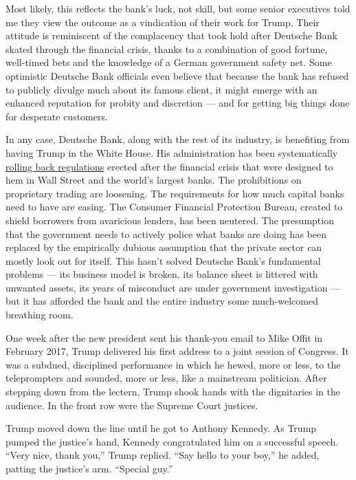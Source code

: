 Most likely, this reflects the bank's luck, not skill, but some senior
executives told me they view the outcome as a vindication of their work
for Trump. Their attitude is reminiscent of the complacency that took
hold after ­Deutsche Bank skated through the financial crisis, thanks to
a combination of good fortune, well-­timed bets and the knowledge of a
German government safety net. Some optimistic ­Deutsche Bank officials
even believe that because the bank has refused to publicly divulge much
about its famous client, it might emerge with an enhanced reputation for
probity and discretion --- and for getting big things done for desperate
customers.

In any case, ­Deutsche Bank, along with the rest of its industry, is
benefiting from having Trump in the White House. His administration has
been systematically
\href{https://www.nytimes3xbfgragh.onion/2019/10/10/business/economy/federal-reserve-bank-regulations.html}{rolling
back regulations} erected after the financial crisis that were designed
to hem in Wall Street and the world's largest banks. The prohibitions on
proprietary trading are loosening. The requirements for how much capital
banks need to have are easing. The Consumer Financial Protection Bureau,
created to shield borrowers from avaricious lenders, has been neutered.
The presumption that the government needs to actively police what banks
are doing has been replaced by the empirically dubious assumption that
the private sector can mostly look out for itself. This hasn't solved
­Deutsche Bank's fundamental problems --- its business model is broken,
its balance sheet is littered with unwanted assets, its years of
misconduct are under government investigation --- but it has afforded
the bank and the entire industry some much-­welcomed breathing room.

One week after the new president sent his thank-you email to Mike Offit
in February 2017, Trump delivered his first address to a joint session
of Congress. It was a subdued, disciplined performance in which he
hewed, more or less, to the teleprompters and sounded, more or less,
like a mainstream politician. After stepping down from the lectern,
Trump shook hands with the dignitaries in the audience. In the front row
were the Supreme Court justices.

Trump moved down the line until he got to Anthony Kennedy. As Trump
pumped the justice's hand, Kennedy congratulated him on a successful
speech. ``Very nice, thank you,'' Trump replied. ``Say hello to your
boy,'' he added, patting the justice's arm. ``Special guy.''

